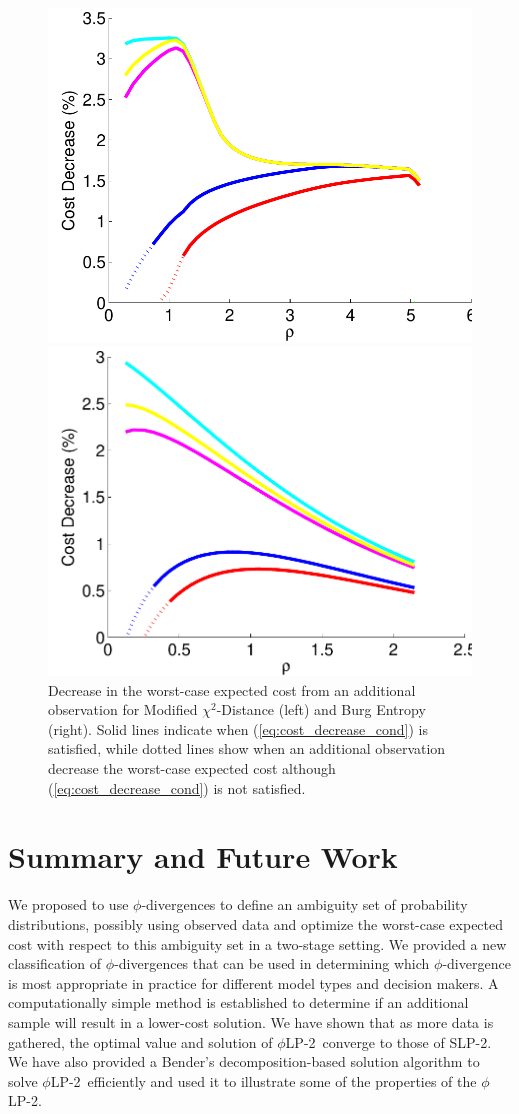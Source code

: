 \documentclass[12pt]{article}
\theoremstyle{plain}
\theoremstyle{definition}
\theoremstyle{remark}
\newcommand{\plp}{$\phi$LP-2}
\begin{document}
\begin{figure}
	\FIGURE
	{%
		\includegraphics*[width=.45\textwidth]{images/mchi2_decrease_condition}%
		\includegraphics*[width=.45\textwidth]{images/burg_decrease_condition}%
	}
	{
		Decrease in the worst-case expected cost from an additional observation  for Modified $\chi^2$-Distance (left) and Burg Entropy (right).
		Solid lines indicate when (\ref{eq:cost_decrease_cond}) is satisfied, while dotted lines show when an additional observation decrease the worst-case expected cost although (\ref{eq:cost_decrease_cond}) is not satisfied.
		\label{fig:value}
	}
	{}
\end{figure}

\section{Summary and Future Work}
\label{sec:plp_conclusions}

We proposed to use $\phi$-divergences
to define an ambiguity set of probability distributions, possibly using observed data and optimize the worst-case expected cost with respect to this ambiguity set in a two-stage setting.
We provided a new classification of $\phi$-divergences that can be used in determining which $\phi$-divergence is most appropriate in practice for different model types and decision makers.
A computationally simple method is established to determine if an additional sample %
will result in a lower-cost solution.
We have shown that as more data is gathered, the optimal value and solution of \plp\ converge to those of SLP-2. 
We have also provided a Bender's decomposition-based solution algorithm to solve \plp\ efficiently and used it to illustrate some of the properties of the \plp.
\end{document}
